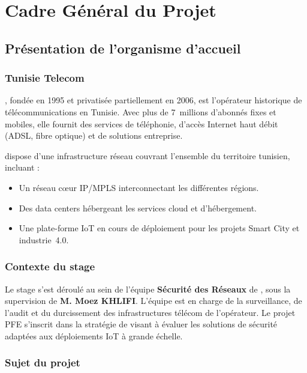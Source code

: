 \chapter{Cadre Général du Projet}

\section{Présentation de l'organisme d'accueil}

\subsection{Tunisie Telecom}

\TT{}, fondée en 1995 et privatisée partiellement en 2006, est l'opérateur historique de télécommunications en Tunisie. Avec plus de 7~millions d'abonnés fixes et mobiles, elle fournit des services de téléphonie, d'accès Internet haut débit (ADSL, fibre optique) et de solutions entreprise.

\TT{} dispose d'une infrastructure réseau couvrant l'ensemble du territoire tunisien, incluant :
\begin{itemize}
  \item Un réseau cœur IP/MPLS interconnectant les différentes régions.
  \item Des data centers hébergeant les services cloud et d'hébergement.
  \item Une plate-forme IoT en cours de déploiement pour les projets Smart City et industrie~4.0.
\end{itemize}

\subsection{Contexte du stage}

Le stage s'est déroulé au sein de l'équipe \textbf{Sécurité des Réseaux} de \TT{}, sous la supervision de \textbf{M. Moez KHLIFI}. L'équipe est en charge de la surveillance, de l'audit et du durcissement des infrastructures télécom de l'opérateur. Le projet PFE s'inscrit dans la stratégie de \TT{} visant à évaluer les solutions de sécurité adaptées aux déploiements IoT à grande échelle.

\subsection{Sujet du projet}

